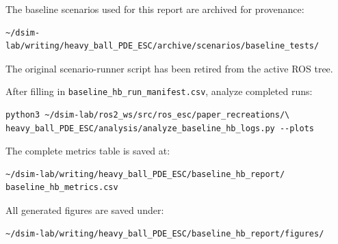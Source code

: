 \documentclass[11pt]{article}
\begin{document}
The baseline scenarios used for this report are archived for provenance:
\begin{verbatim}
~/dsim-lab/writing/heavy_ball_PDE_ESC/archive/scenarios/baseline_tests/
\end{verbatim}

The original scenario-runner script has been retired from the active ROS tree.

After filling in \texttt{baseline\_hb\_run\_manifest.csv}, analyze completed
runs:
\begin{verbatim}
python3 ~/dsim-lab/ros2_ws/src/ros_esc/paper_recreations/\
heavy_ball_PDE_ESC/analysis/analyze_baseline_hb_logs.py --plots
\end{verbatim}

The complete metrics table is saved at:
\begin{verbatim}
~/dsim-lab/writing/heavy_ball_PDE_ESC/baseline_hb_report/
baseline_hb_metrics.csv
\end{verbatim}

All generated figures are saved under:
\begin{verbatim}
~/dsim-lab/writing/heavy_ball_PDE_ESC/baseline_hb_report/figures/
\end{verbatim}
\end{document}
